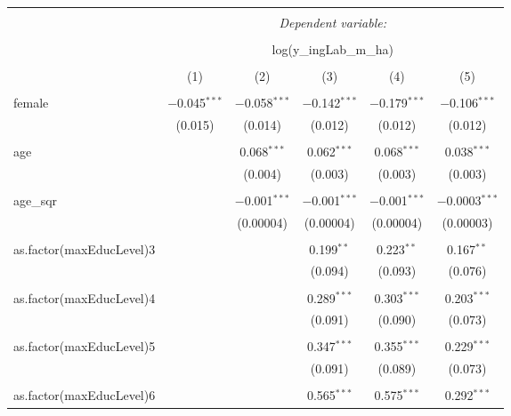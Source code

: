 
\begin{table}[!htbp] \centering 
  \caption{} 
  \label{} 
\begin{tabular}{@{\extracolsep{5pt}}lccccc} 
\\[-1.8ex]\hline 
\hline \\[-1.8ex] 
 & \multicolumn{5}{c}{\textit{Dependent variable:}} \\ 
\cline{2-6} 
\\[-1.8ex] & \multicolumn{5}{c}{log(y\_ingLab\_m\_ha)} \\ 
\\[-1.8ex] & (1) & (2) & (3) & (4) & (5)\\ 
\hline \\[-1.8ex] 
 female & $-$0.045$^{***}$ & $-$0.058$^{***}$ & $-$0.142$^{***}$ & $-$0.179$^{***}$ & $-$0.106$^{***}$ \\ 
  & (0.015) & (0.014) & (0.012) & (0.012) & (0.012) \\ 
  & & & & & \\ 
 age &  & 0.068$^{***}$ & 0.062$^{***}$ & 0.068$^{***}$ & 0.038$^{***}$ \\ 
  &  & (0.004) & (0.003) & (0.003) & (0.003) \\ 
  & & & & & \\ 
 age\_sqr &  & $-$0.001$^{***}$ & $-$0.001$^{***}$ & $-$0.001$^{***}$ & $-$0.0003$^{***}$ \\ 
  &  & (0.00004) & (0.00004) & (0.00004) & (0.00003) \\ 
  & & & & & \\ 
 as.factor(maxEducLevel)3 &  &  & 0.199$^{**}$ & 0.223$^{**}$ & 0.167$^{**}$ \\ 
  &  &  & (0.094) & (0.093) & (0.076) \\ 
  & & & & & \\ 
 as.factor(maxEducLevel)4 &  &  & 0.289$^{***}$ & 0.303$^{***}$ & 0.203$^{***}$ \\ 
  &  &  & (0.091) & (0.090) & (0.073) \\ 
  & & & & & \\ 
 as.factor(maxEducLevel)5 &  &  & 0.347$^{***}$ & 0.355$^{***}$ & 0.229$^{***}$ \\ 
  &  &  & (0.091) & (0.089) & (0.073) \\ 
  & & & & & \\ 
 as.factor(maxEducLevel)6 &  &  & 0.565$^{***}$ & 0.575$^{***}$ & 0.292$^{***}$ \\ 

\end{tabular}
\end{table}
